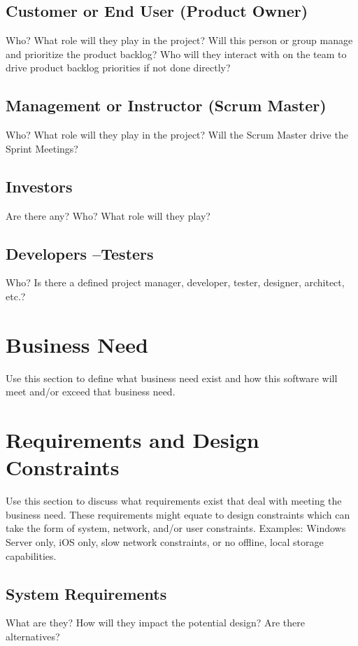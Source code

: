\subsection{Customer or End User (Product Owner)}
Who?  What role will they play in the project?  Will this person or group manage 
and prioritize the product backlog?  Who will they interact with on the team to 
drive product backlog priorities if not done directly? 

\subsection{Management or Instructor (Scrum Master)}
Who?  What role will they play in the project?  Will the Scrum Master drive the 
Sprint Meetings? 


\subsection{Investors}
Are there any?  Who?  What role will they play? 


\subsection{Developers --Testers}
Who?  Is there a defined project manager, developer, tester, designer, architect, 
etc.? 


\section{Business Need}
Use this section to define what business need exist and how this software will 
meet and/or exceed that business need.   

\section{Requirements and Design Constraints}
Use this section to discuss what requirements exist that deal with meeting the 
business need.  These requirements might equate to design constraints which can 
take the form of system, network, and/or user constraints.  Examples:  Windows 
Server only, iOS only, slow network constraints, or no offline, local storage capabilities. 


\subsection{System  Requirements}
What are they?  How will they impact the potential design?  Are there alternatives? 


